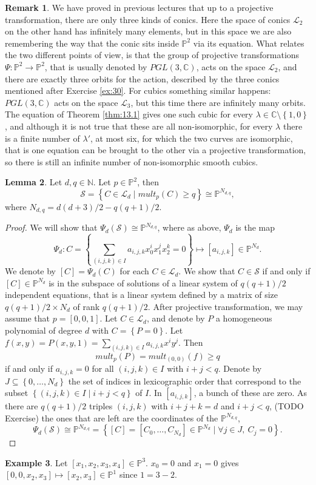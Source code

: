 \documentclass{article}
\newcommand{\N}{\mathbb{N}}
\newcommand{\C}{\mathbb{C}}
\renewcommand{\P}{\mathbb{P}}
\newcommand{\rb}[1]{\left( #1 \right)}
\renewcommand{\sb}[1]{\left[ #1 \right]}
\newcommand{\cb}[1]{\left\{ #1 \right\}}
\theoremstyle{definition}\newtheorem{definition}{Definition}[section]
\theoremstyle{definition}\newtheorem{notation}[definition]{Notation}
\theoremstyle{definition}\newtheorem{remark}[definition]{Remark}
\theoremstyle{definition}\newtheorem{example}[definition]{Example}
\theoremstyle{definition}\newtheorem{fact}{Fact}
\theoremstyle{definition}\newtheorem{exercise}{Exercise}
\newtheorem{lemma}[definition]{Lemma}
\begin{document}
\begin{remark}
We have proved in previous lectures that up to a projective transformation, there are only three kinds of conics. Here the space of conics $ \mathcal{L}_2 $ on the other hand has infinitely many elements, but in this space we are also remembering the way that the conic sits inside $ \P^2 $ via its equation. What relates the two different points of view, is that the group of projective transformations $ \Psi : \P^2 \to \P^2 $, that is usually denoted by $ PGL\rb{3, \C} $, acts on the space $ \mathcal{L}_2 $, and there are exactly three orbits for the action, described by the three conics mentioned after Exercise \ref{ex:30}. For cubics something similar happens: $ PGL\rb{3, \C} $ acts on the space $ \mathcal{L}_3 $, but this time there are infinitely many orbits. The equation of Theorem \ref{thm:13.1} gives one such cubic for every $ \lambda \in \C \setminus \cb{1, 0} $, and although it is not true that these are all non-isomorphic, for every $ \lambda $ there is a finite number of $ \lambda' $, at most six, for which the two curves are isomorphic, that is one equation can be brought to the other via a projective transformation, so there is still an infinite number of non-isomorphic smooth cubics.
\end{remark}

\begin{lemma}
Let $ d, q \in \N $. Let $ p \in \P^2 $, then
$$ \mathcal{S} = \cb{C \in \mathcal{L}_d \mid mult_p\rb{C} \ge q} \cong \P^{N_{d, q}}, $$
where $ N_{d, q} = d\rb{d + 3} / 2 - q\rb{q + 1} / 2. $
\end{lemma}

\begin{proof}
We will show that $ \Psi_d\rb{\mathcal{S}} \cong \P^{N_{d, q}} $, where as above, $ \Psi_d $ is the map
$$ \Psi_d : C = \cb{\sum_{\rb{i, j, k} \in I} a_{i, j, k}x_0^ix_1^jx_2^k = 0} \mapsto \sb{a_{i, j, k}} \in \P^{N_d}. $$
We denote by $ \sb{C} = \Psi_d\rb{C} $ for each $ C \in \mathcal{L}_d $. We show that $ C \in \mathcal{S} $ if and only if $ \sb{C} \in \P^{N_d} $ is in the subspace of solutions of a linear system of $ q\rb{q + 1} / 2 $ independent equations, that is a linear system defined by a matrix of size $ q\rb{q + 1} / 2 \times N_d $ of rank $ q\rb{q + 1} / 2 $. After projective transformation, we may assume that $ p = \sb{0, 0, 1} $. Let $ C \in \mathcal{L}_d $, and denote by $ P $ a homogeneous polynomial of degree $ d $ with $ C = \cb{P = 0} $. Let $ f\rb{x, y} = P\rb{x, y, 1} =  \sum_{\rb{i, j, k} \in I} a_{i, j, k}x^iy^j $. Then
$$ mult_p\rb{P} = mult_{\rb{0, 0}}\rb{f} \ge q $$
if and only if $ a_{i, j, k} = 0 $ for all $ \rb{i, j, k} \in I $ with $ i + j < q $. Denote by $ J \subseteq \cb{0, \dots, N_d} $ the set of indices in lexicographic order that correspond to the subset $ \cb{\rb{i, j, k} \in I \mid i + j < q} $ of $ I $. In $ \sb{a_{i, j, k}} $, a bunch of these are zero. As there are $ q\rb{q + 1} / 2 $ triples $ \rb{i, j, k} $ with $ i + j + k = d $ and $ i + j < q $, (TODO Exercise) the ones that are left are the coordinates of the $ \P^{N_{d, q}} $,
$$ \Psi_d\rb{\mathcal{S}} \cong \P^{N_{d, q}} = \cb{\sb{C} = \sb{C_0, \dots, C_{N_d}} \in \P^{N_d} \mid \forall j \in J, \ C_j = 0}. $$
\end{proof}

\begin{example}
Let $ \sb{x_1, x_2, x_3, x_4} \in \P^3 $. $ x_0 = 0 $ and $ x_1 = 0 $ gives $ \sb{0, 0, x_2, x_3} \mapsto \sb{x_2, x_3} \in \P^1 $ since $ 1 = 3 - 2 $.
\end{example}
\end{document}

